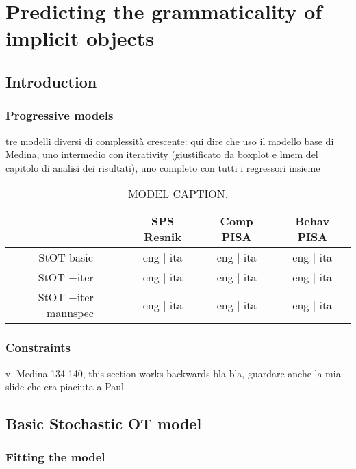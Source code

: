 \setchapterpreamble[u]{\margintoc}
\chapter{Predicting the grammaticality of implicit objects}

\section{Introduction} 

\subsection{Progressive models} 

tre modelli diversi di complessità crescente: qui dire che uso il modello base di Medina, uno intermedio con iterativity (giustificato da boxplot e lmem del capitolo di analisi dei risultati), uno completo con tutti i regressori insieme

\begin{table}[htb] %
\caption{MODEL CAPTION.}
\begin{tabular}{cccc}
& SPS Resnik & Comp PISA & Behav PISA \\
\hline
StOT basic & eng | ita          & eng | ita   & eng | ita   \\
StOT +iter & eng | ita  & eng | ita & eng | ita \\
StOT +iter +mannspec & eng | ita   & eng | ita   & eng | ita  
\end{tabular}
\end{table}


\subsection{Constraints} 

v. Medina 134-140, this section works backwards bla bla, guardare anche la mia slide che era piaciuta a Paul


\section{Basic Stochastic OT model} 


\subsection{Fitting the model} 

